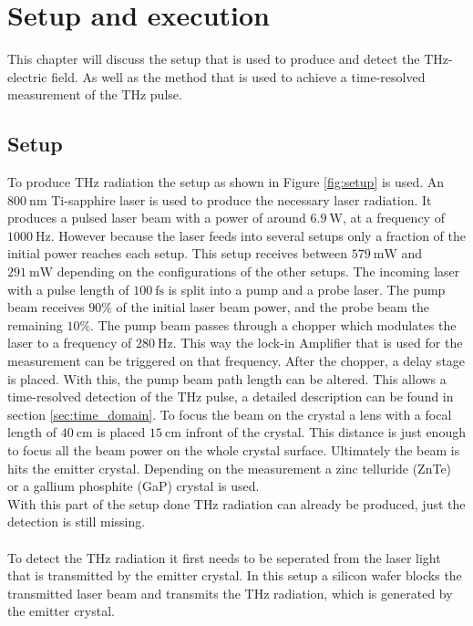 \chapter{Setup and execution}
This chapter will discuss the setup that is used to produce and detect the $\si{\tera\hertz}$-electric field.
As well as the method that is used to achieve a time-resolved measurement of the $\si{\tera\hertz}$ pulse.

\section{Setup}
\label{sec:setup}
To produce $\si{\tera\hertz}$ radiation the setup as shown in Figure \ref{fig:setup} is used.
An $\SI{800}{\nano\meter}$ Ti-sapphire laser is used to produce the necessary laser radiation.
It produces a pulsed laser beam with a power of around $\SI{6.9}{\W}$, at a frequency of $\SI{1000}{\Hz}$.
However because the laser feeds into several setups only a fraction of the initial power reaches each setup.
This setup receives between $\SI{579}{\milli\W}$ and $\SI{291}{\milli\W}$ depending on the configurations of the other setups. 
The incoming laser with a pulse length of $\SI{100}{\femto\second}$ is split into a pump and a probe laser.
The pump beam receives $90\%$ of the initial laser beam power, and the probe beam the remaining $10\%$.
The pump beam passes through a chopper which modulates the laser to a frequency of $\SI{280}{\hertz}$.
This way the lock-in Amplifier that is used for the measurement can be triggered on that frequency.
After the chopper, a delay stage is placed.
With this, the pump beam path length can be altered.
This allows a time-resolved detection of the $\si{\tera\hertz}$ pulse, a detailed description can be found in section \ref{sec:time_domain}.
To focus the beam on the crystal a lens with a focal length of $\SI{40}{\centi\meter}$ is placed $\SI{15}{\centi\meter}$ infront of the crystal.
This distance is just enough to focus all the beam power on the whole crystal surface.
Ultimately the beam is hits the emitter crystal.
Depending on the measurement a zinc telluride (ZnTe) or a gallium phosphite (GaP) crystal is used.
\\
With this part of the setup done $\si{\tera\hertz}$ radiation can already be produced, just the detection is still missing.
\\\\
To detect the $\si{\tera\hertz}$ radiation it first needs to be seperated from the laser light that is transmitted by the emitter crystal.
In this setup a silicon wafer blocks the transmitted laser beam and transmits the $\si{\tera\hertz}$ radiation, which is generated by the emitter crystal.
